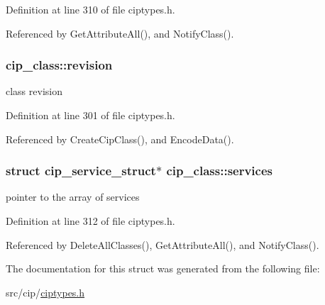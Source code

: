 \-Definition at line 310 of file ciptypes.\-h.



\-Referenced by \-Get\-Attribute\-All(), and \-Notify\-Class().

\hypertarget{structcip__class_a49d0ff69fc0f3f71c6061d0e5f483fe1}{
\subsubsection[{revision}]{ {\bf cip\-\_\-class\-::revision}}}\label{da/d8e/structcip__class_a49d0ff69fc0f3f71c6061d0e5f483fe1}
class revision 

\-Definition at line 301 of file ciptypes.\-h.



\-Referenced by \-Create\-Cip\-Class(), and \-Encode\-Data().

\hypertarget{structcip__class_a9871ebce8163c584f95d1a0c7f00e1f1}{
\subsubsection[{services}]{\setlength{\rightskip}{0pt plus 5cm}struct {\bf cip\-\_\-service\-\_\-struct}$\ast$ {\bf cip\-\_\-class\-::services}}}\label{da/d8e/structcip__class_a9871ebce8163c584f95d1a0c7f00e1f1}
pointer to the array of services 

\-Definition at line 312 of file ciptypes.\-h.



\-Referenced by \-Delete\-All\-Classes(), \-Get\-Attribute\-All(), and \-Notify\-Class().



\-The documentation for this struct was generated from the following file\-:\begin{DoxyCompactItemize}
\item 
src/cip/\hyperlink{ciptypes_8h}{ciptypes.\-h}\end{DoxyCompactItemize}
